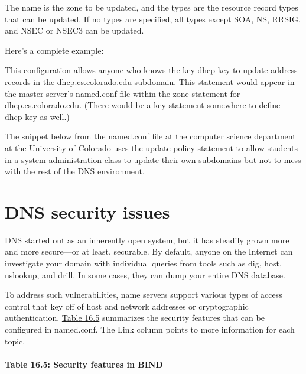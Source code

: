 The {name} is the zone to be updated, and the {types} are the resource
record types that can be updated. If no types are specified, all types
except SOA, NS, RRSIG, and NSEC or NSEC3 can be updated.

Here's a complete
example:\protect\hypertarget{part0024_split_052.htmlux5cux23_idIndexMarker2230}{}{}


This configuration allows anyone who knows the key {dhcp-key} to update
address records in the dhcp.cs.colorado.edu subdomain. This statement
would appear in the master server's {named.conf} file within the {zone}
statement for {dhcp.cs.colorado.edu}. (There would be a {key} statement
somewhere to define {dhcp-key} as well.)

The snippet below from the {named.conf} file at the computer science
department at the University of Colorado uses the {update-policy}
statement to allow students in a system administration class to update
their own subdomains but not to mess with the rest of the DNS
environment.



\section{DNS security issues}

\protect\hypertarget{part0024_split_053.htmlux5cux23_idIndexMarker2232}{}{}DNS
started out as an inherently open system, but it has steadily grown more
and more secure---or at least, securable. By default, anyone on the
Internet can investigate your domain with individual queries from tools
such as {dig}, {host}, {nslookup}, and {drill}.{ }In some cases, they
can dump your entire DNS database.

To address such vulnerabilities, name servers support various types of
access control that key off of host and network addresses or
cryptographic authentication.
\protect\hyperlink{part0024_split_053.htmlux5cux23_idTextAnchor932}{Table
16.5} summarizes the security features that can be configured in
{named.conf}. The Link column points to more information for each topic.

\paragraph[{Table 16.5: }Security features in
BIND]{\texorpdfstring{{Table 16.5:
}\protect\hypertarget{part0024_split_053.htmlux5cux23_idIndexMarker2233}{}{}\protect\hypertarget{part0024_split_053.htmlux5cux23_idTextAnchor932}{}{}Security
features in BIND}{Table 16.5: Security features in BIND}}

